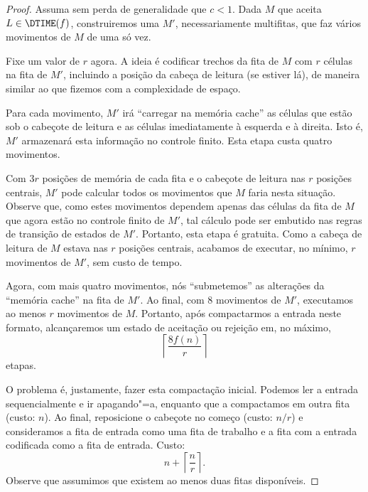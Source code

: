 \begin{proof}
    Assuma sem perda de generalidade que $c < 1$.
    Dada $M$ que aceita $L \in \DTIME(f)$,
    construiremos uma $M'$,
    necessariamente multifitas,
    que faz vários movimentos de $M$ de uma só vez.

    Fixe um valor de $r$ agora.
    A ideia é codificar trechos da fita de $M$
    com $r$ células
    na fita de $M'$,
    incluindo a posição da cabeça de leitura
    (se estiver lá),
    de maneira similar ao que fizemos com a complexidade de espaço.

    Para cada movimento,
    $M'$ irá ``carregar na memória cache''
    as células que estão sob o cabeçote de leitura
    e as células imediatamente à esquerda e à direita.
    Isto é, $M'$ armazenará esta informação
    no controle finito.
    Esta etapa custa quatro movimentos.

    Com $3r$ posições de memória de cada fita
    e o cabeçote de leitura nas $r$ posições centrais,
    $M'$ pode calcular todos os movimentos que $M$ faria nesta situação.
    Observe que,
    como estes movimentos dependem apenas
    das células da fita de $M$
    que agora estão no controle finito de $M'$,
    tal cálculo pode ser embutido nas regras de transição de estados de $M'$.
    Portanto, esta etapa é gratuita.
    Como a cabeça de leitura de $M$ estava nas $r$ posições centrais,
    acabamos de executar,
    no mínimo,
    $r$ movimentos de $M'$,
    sem custo de tempo.

    Agora, com mais quatro movimentos,
    nós ``submetemos'' as alterações da ``memória cache''
    na fita de $M'$.
    Ao final, com $8$ movimentos de $M'$,
    executamos ao menos $r$ movimentos de $M$.
    Portanto, após compactarmos a entrada
    neste formato,
    alcançaremos um estado de aceitação ou rejeição
    em, no máximo,
    \begin{equation*}
        \left\lceil \frac{8f(n)}{r} \right\rceil
    \end{equation*}
    etapas.

    O problema é,
    justamente,
    fazer esta compactação inicial.
    Podemos ler a entrada sequencialmente
    e ir apagando"=a,
    enquanto que a compactamos em outra fita
    (custo: $n$).
    Ao final,
    reposicione o cabeçote no começo
    (custo: $n/r$)
    e consideramos a fita de entrada como uma fita de trabalho
    e a fita com a entrada codificada
    como a fita de entrada.
    Custo:
    \begin{equation*}
        n + \left\lceil \frac n r \right\rceil.
    \end{equation*}
    Observe que assumimos
    que existem ao menos duas fitas disponíveis.


\end{proof}
